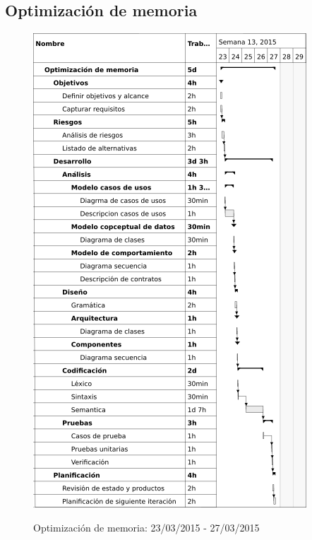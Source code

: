 \subsection{Optimización de memoria}
\begin{center}
\begin{figure}[H]
\centering
\includegraphics[scale=1]{planning/18-optimizacion-memoria.png} \\
\caption{Optimización de memoria: 23/03/2015 - 27/03/2015 }
\end{figure}
\end{center}

